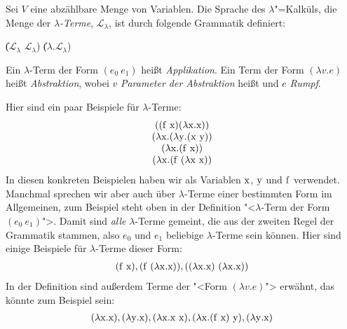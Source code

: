 \begin{definition}
  
  Sei $V$ eine abzählbare Menge von Variablen. 
  Die Sprache des $\lambda$"=Kalküls, die Menge der
  \textit{$\lambda$-Terme},
  $\mathcal{L}_{\lambda}$, ist
  durch folgende Grammatik definiert:
  \begin{grammar}
     \: 
    \> \| ($\mathcal{L}_{\lambda}$ $\mathcal{L}_{\lambda}$)
    \> \| ($\lambda$.$\mathcal{L}_{\lambda}$)
  \end{grammar}
%
  Ein $\lambda$-Term der Form $(e_0~e_1)$ heißt
  \textit{Applikation}. Ein Term der Form
  $(\lambda v.e)$ heißt \textit{Abstraktion}, wobei
  $v$ \textit{Parameter der Abstraktion} heißt und
  $e$ \textit{Rumpf}.
\end{definition}
%
Hier sind ein paar Beispiele für $\lambda$-Terme:
%
\begin{displaymath}
  \begin{array}{c}
    ((\mathrm f~\mathrm x)
    (\lambda \mathrm x.\mathrm x))\\
    (\lambda \mathrm x.(\lambda \mathrm y.(\mathrm x~\mathrm y))\\
    (\lambda \mathrm x.(\mathrm f~\mathrm x))\\
    (\lambda \mathrm x.(\mathrm f~(\lambda \mathrm x~\mathrm x))
  \end{array}
\end{displaymath}
% 
In diesen konkreten Beispielen haben wir als Variablen $\mathrm x$, $\mathrm y$ und
$\mathrm f$ verwendet.  Manchmal sprechen wir aber auch über
$\lambda$-Terme einer bestimmten Form im Allgemeinen, zum Beispiel
steht oben in der Definition "<$\lambda$-Term der Form
$(e_0~e_1)$">. Damit sind \emph{alle} $\lambda$-Terme gemeint, die aus der
zweiten Regel der Grammatik stammen, also $e_0$ und $e_1$ beliebige
$\lambda$-Terme sein können.  Hier sind einige Beispiele für
$\lambda$-Terme dieser Form:
%
\begin{displaymath}
  \begin{array}{c}
    (\mathrm f~\mathrm x),
    (\mathrm f~(\lambda \mathrm x.\mathrm x)),
    ((\lambda \mathrm x.\mathrm x)~(\lambda \mathrm x.\mathrm x))
  \end{array}
\end{displaymath}
%
In der Definition sind außerdem Terme der "<Form $(\lambda v.e)$">
erwähnt, das könnte zum Beispiel sein:
%
\begin{displaymath}
  \begin{array}{c}
    (\lambda \mathrm x.\mathrm x),
    (\lambda \mathrm y.\mathrm x),
    (\lambda \mathrm x.\mathrm x~\mathrm x),
    (\lambda \mathrm x.(\mathrm f~\mathrm x)~\mathrm y),
    (\lambda \mathrm y.\mathrm x)
  \end{array}
\end{displaymath}
%

